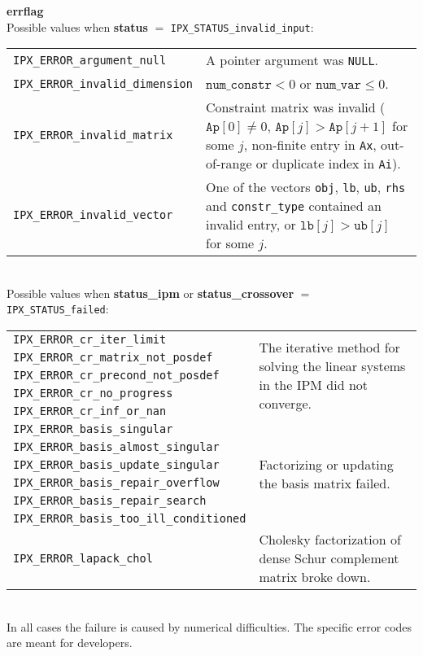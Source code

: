 \documentclass{article}
\newcommand{\ct}{\texttt}
\newcommand{\info}[2]{
  \noindent\begin{minipage}{\textwidth}
    \textbf{#1}\\
    #2
  \end{minipage}
  \vskip 1\baselineskip
}
\begin{document}
\info{errflag}{
  Possible values when \textbf{status} $=$
  \ct{IPX\_STATUS\_invalid\_input}:\\[1em]
  \begin{tabular}{lp{8cm}}
    \ct{IPX\_ERROR\_argument\_null} & A pointer argument was \ct{NULL}.\\
    \ct{IPX\_ERROR\_invalid\_dimension} & $\ct{num\_constr}<0$ or
    $\ct{num\_var}\le0$.\\
    \ct{IPX\_ERROR\_invalid\_matrix} & Constraint matrix was invalid
    ($\ct{Ap}[0]\neq0$, $\ct{Ap}[j]>\ct{Ap}[j+1]$ for some $j$, non-finite entry
    in \ct{Ax}, out-of-range or duplicate index in \ct{Ai}).\\
    \ct{IPX\_ERROR\_invalid\_vector} & One of the vectors \ct{obj}, \ct{lb},
    \ct{ub}, \ct{rhs} and \ct{constr\_type} contained an invalid entry, or
    $\ct{lb}[j]>\ct{ub}[j]$ for some $j$.\\
  \end{tabular}\\[1.5em]

  Possible values when \textbf{status\_ipm} or \textbf{status\_crossover} $=$
  \ct{IPX\_STATUS\_failed}:\\[1em]
  \begin{tabular}{lp{8cm}}
    \ct{IPX\_ERROR\_cr\_iter\_limit} &
    \multirow{5}{8cm}{The iterative method for solving the linear systems in the
      IPM did not converge.}\\
    \ct{IPX\_ERROR\_cr\_matrix\_not\_posdef} &\\
    \ct{IPX\_ERROR\_cr\_precond\_not\_posdef} &\\
    \ct{IPX\_ERROR\_cr\_no\_progress} &\\
    \ct{IPX\_ERROR\_cr\_inf\_or\_nan} &\\[1em]
    \ct{IPX\_ERROR\_basis\_singular} &
    \multirow{6}{8cm}{Factorizing or updating the basis matrix failed.}\\
    \ct{IPX\_ERROR\_basis\_almost\_singular} &\\
    \ct{IPX\_ERROR\_basis\_update\_singular} &\\
    \ct{IPX\_ERROR\_basis\_repair\_overflow} &\\
    \ct{IPX\_ERROR\_basis\_repair\_search} &\\
    \ct{IPX\_ERROR\_basis\_too\_ill\_conditioned} &\\[1em]
    \ct{IPX\_ERROR\_lapack\_chol} & Cholesky factorization of dense Schur
    complement matrix broke down.
  \end{tabular}\\[1em]
  In all cases the failure is caused by numerical difficulties. The specific
  error codes are meant for developers.
}
\end{document}
